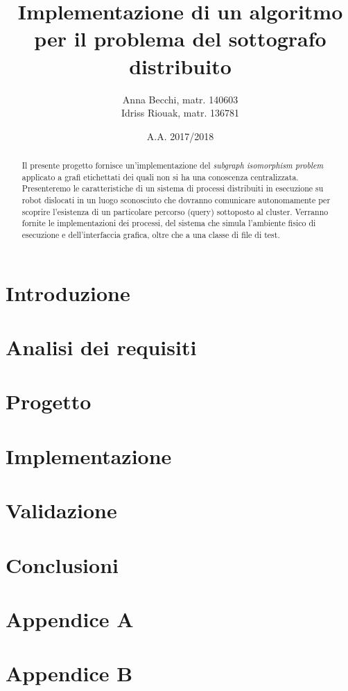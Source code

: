 \documentclass{checkpoint/llncs}
\title{Implementazione di un algoritmo\\
  per il problema del sottografo distribuito}
\author{Anna Becchi, matr. 140603\\
  Idriss Riouak, matr. 136781}
\institute{Laurea Magistrale in Informatica\\Universit\`a di Udine}
\date{A.A. 2017/2018}
\begin{document}
\maketitle
\begin{abstract}
  Il presente progetto fornisce un'implementazione del
  \emph{subgraph isomorphism problem} applicato a grafi
  etichettati dei quali non si ha una conoscenza centralizzata.
  Presenteremo le caratteristiche di un sistema di processi
  distribuiti in esecuzione su robot dislocati in un
  luogo sconosciuto che dovranno comunicare autonomamente
  per scoprire l'esistenza di un particolare percorso
  (query) sottoposto al cluster.
  Verranno fornite le implementazioni dei
  processi, del sistema che simula l'ambiente fisico
  di esecuzione e dell'interfaccia grafica, oltre che a una
  classe di file di test.
\end{abstract}

\section{Introduzione}
\label{ch:intro}


\newpage
\section{Analisi dei requisiti}
\label{ch:analysis}


\newpage
\section{Progetto}
\label{ch:project}


\newpage
\section{Implementazione}
\label{ch:impl}


\newpage
\section{Validazione}
\label{ch:validation}


\newpage
\section{Conclusioni}
\label{ch:conclusions}


\newpage
\appendix
\section{Appendice A}
\label{ch:appendixA}

\newpace

\appendix
\section{Appendice B}
\label{ch:appendixB}

\end{document}
